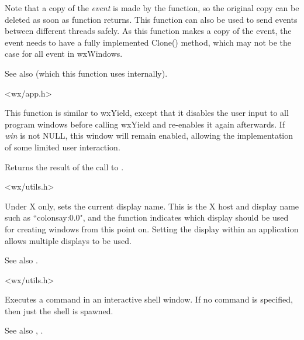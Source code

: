 Note that a copy of the {\it event} is made by the function, so the original
copy can be deleted as soon as function returns. This function can also be used
to send events between different threads safely. As this function makes a
copy of the event, the event needs to have a fully implemented Clone() method,
which may not be the case for all event in wxWindows.

See also  (which this function
uses internally).


<wx/app.h>

\label{wxsafeyield}


This function is similar to wxYield, except that it disables the user input to
all program windows before calling wxYield and re-enables it again
afterwards. If {\it win} is not NULL, this window will remain enabled, 
allowing the implementation of some limited user interaction.

Returns the result of the call to .


<wx/utils.h>

\label{wxsetdisplayname}


Under X only, sets the current display name. This is the X host and display name such
as ``colonsay:0.0", and the function indicates which display should be used for creating
windows from this point on. Setting the display within an application allows multiple
displays to be used.

See also .


<wx/utils.h>

\label{wxshell}


Executes a command in an interactive shell window. If no command is
specified, then just the shell is spawned.

See also , .

